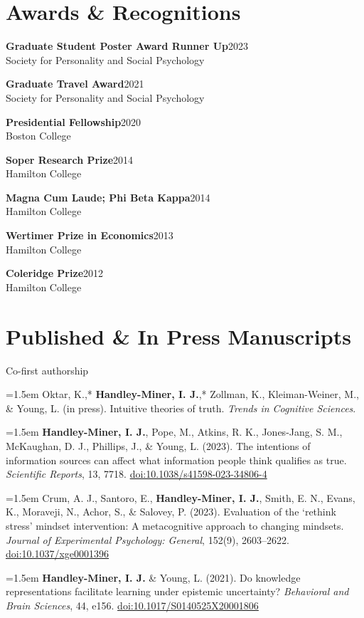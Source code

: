 \documentclass[11pt, letterpaper]{article}
\newcommand{\cventry}[3]{%
    \textbf{#1}\hfill #2\\
    {\color{mutedgray}#3}\par\vspace{0.3em}%
}
\newcommand{\pub}[1]{\par\hangindent=1.5em\hangafter=1 #1\par\vspace{0.4em}}
\begin{document}
\section{Awards \& Recognitions}

\cventry{Graduate Student Poster Award Runner Up}{2023}
    {Society for Personality and Social Psychology}

\cventry{Graduate Travel Award}{2021}
    {Society for Personality and Social Psychology}

\cventry{Presidential Fellowship}{2020}
    {Boston College}

\cventry{Soper Research Prize}{2014}
    {Hamilton College}

\cventry{Magna Cum Laude; Phi Beta Kappa}{2014}
    {Hamilton College}

\cventry{Wertimer Prize in Economics}{2013}
    {Hamilton College}

\cventry{Coleridge Prize}{2012}
    {Hamilton College}

\section{Published \& In Press Manuscripts}

{\small *Co-first authorship}\vspace{0.4em}

\pub{Oktar, K.,* \textbf{Handley-Miner, I. J.},* Zollman, K., Kleiman-Weiner, M., \& Young, L. (in press). Intuitive theories of truth. \textit{Trends in Cognitive Sciences}.}

\pub{\textbf{Handley-Miner, I. J.}, Pope, M., Atkins, R. K., Jones-Jang, S. M., McKaughan, D. J., Phillips, J., \& Young, L. (2023). The intentions of information sources can affect what information people think qualifies as true. \textit{Scientific Reports}, 13, 7718. \href{https://doi.org/10.1038/s41598-023-34806-4}{doi:10.1038/s41598-023-34806-4}}

\pub{Crum, A. J., Santoro, E., \textbf{Handley-Miner, I. J.}, Smith, E. N., Evans, K., Moraveji, N., Achor, S., \& Salovey, P. (2023). Evaluation of the `rethink stress' mindset intervention: A metacognitive approach to changing mindsets. \textit{Journal of Experimental Psychology: General}, 152(9), 2603--2622. \href{https://doi.org/10.1037/xge0001396}{doi:10.1037/xge0001396}}

\pub{\textbf{Handley-Miner, I. J.} \& Young, L. (2021). Do knowledge representations facilitate learning under epistemic uncertainty? \textit{Behavioral and Brain Sciences}, 44, e156. \href{https://doi.org/10.1017/S0140525X20001806}{doi:10.1017/S0140525X20001806}}
\end{document}
